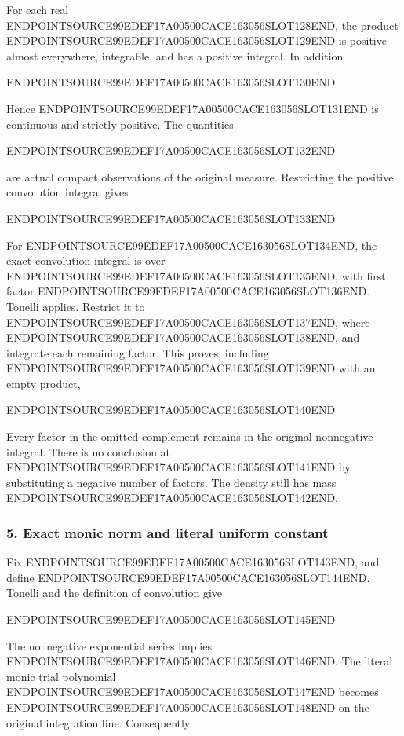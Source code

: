 For each real ENDPOINTSOURCE99EDEF17A00500CACE163056SLOT128END, the product ENDPOINTSOURCE99EDEF17A00500CACE163056SLOT129END is positive almost everywhere, integrable, and has a positive integral. In addition

ENDPOINTSOURCE99EDEF17A00500CACE163056SLOT130END

Hence ENDPOINTSOURCE99EDEF17A00500CACE163056SLOT131END is continuous and strictly positive. The quantities

ENDPOINTSOURCE99EDEF17A00500CACE163056SLOT132END

are actual compact observations of the original measure. Restricting the positive convolution integral gives

ENDPOINTSOURCE99EDEF17A00500CACE163056SLOT133END

For ENDPOINTSOURCE99EDEF17A00500CACE163056SLOT134END, the exact convolution integral is over ENDPOINTSOURCE99EDEF17A00500CACE163056SLOT135END, with first factor ENDPOINTSOURCE99EDEF17A00500CACE163056SLOT136END. Tonelli applies. Restrict it to ENDPOINTSOURCE99EDEF17A00500CACE163056SLOT137END, where ENDPOINTSOURCE99EDEF17A00500CACE163056SLOT138END, and integrate each remaining factor. This proves, including ENDPOINTSOURCE99EDEF17A00500CACE163056SLOT139END with an empty product,

ENDPOINTSOURCE99EDEF17A00500CACE163056SLOT140END

Every factor in the omitted complement remains in the original nonnegative integral. There is no conclusion at ENDPOINTSOURCE99EDEF17A00500CACE163056SLOT141END by substituting a negative number of factors. The density still has mass ENDPOINTSOURCE99EDEF17A00500CACE163056SLOT142END.

\subsubsection{5. Exact monic norm and literal uniform constant}\label{endpoint-arithmetic_intake--exact-monic-norm-and-literal-uniform-constant}

Fix ENDPOINTSOURCE99EDEF17A00500CACE163056SLOT143END, and define ENDPOINTSOURCE99EDEF17A00500CACE163056SLOT144END. Tonelli and the definition of convolution give

ENDPOINTSOURCE99EDEF17A00500CACE163056SLOT145END

The nonnegative exponential series implies ENDPOINTSOURCE99EDEF17A00500CACE163056SLOT146END. The literal monic trial polynomial ENDPOINTSOURCE99EDEF17A00500CACE163056SLOT147END becomes ENDPOINTSOURCE99EDEF17A00500CACE163056SLOT148END on the original integration line. Consequently

